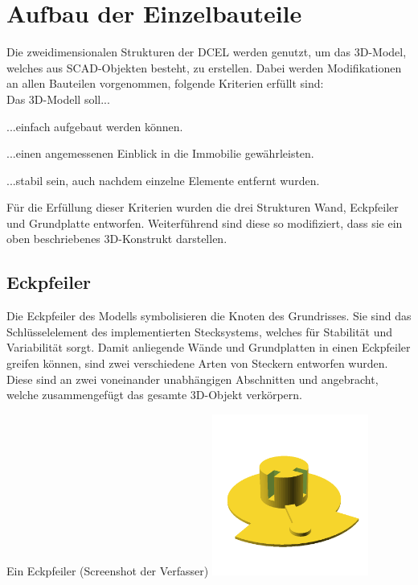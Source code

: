 \section{Aufbau der Einzelbauteile}
Die zweidimensionalen Strukturen der DCEL werden genutzt, um das 3D-Model, welches aus SCAD-Objekten besteht, zu erstellen.
Dabei werden Modifikationen an allen Bauteilen vorgenommen, folgende Kriterien erfüllt sind:\\
Das 3D-Modell soll...
\begin{compactenum}
	\item ...einfach aufgebaut werden können.
	\item ...einen angemessenen Einblick in die Immobilie gewährleisten.
	\item ...stabil sein, auch nachdem einzelne Elemente entfernt wurden.
\end{compactenum}
Für die Erfüllung dieser Kriterien wurden die drei Strukturen Wand, Eckpfeiler und Grundplatte entworfen.
Weiterführend sind diese so modifiziert, dass sie ein oben beschriebenes 3D-Konstrukt darstellen.

\subsection{Eckpfeiler}
Die Eckpfeiler des Modells symbolisieren die Knoten des Grundrisses.
Sie sind das Schlüsselelement des implementierten Stecksystems, welches für Stabilität und Variabilität sorgt.
Damit anliegende Wände und Grundplatten in einen Eckpfeiler greifen können, sind zwei verschiedene Arten von Steckern entworfen wurden.
Diese sind an zwei voneinander unabhängigen Abschnitten  und  angebracht, welche zusammengefügt das gesamte 3D-Objekt verkörpern.
\begin{Bild}{Ein Eckpfeiler (Screenshot der Verfasser)}
	\includegraphics[height=200px]{Bilder/Untereinheit_Ecke}
\end{Bild}

